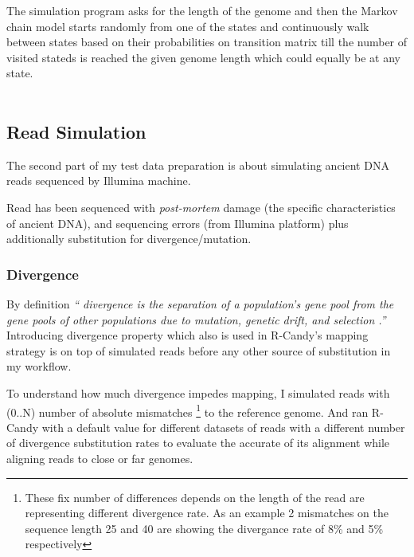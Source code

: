 \documentclass[11pt,a4paper]{report}
\newcommand{\quotes}[1]{``#1''}
\begin{document}
The simulation program asks for the length of the genome and then the Markov chain 
model starts randomly from one of the states and continuously walk between states 
based on their probabilities on transition matrix till the number of visited stateds 
is reached the given genome length which could equally be at any state. \\\\



\subsection{Read Simulation} \label{Read Simulation}

The second part of my test data preparation is about simulating ancient DNA reads 
sequenced by Illumina machine.

Read has been sequenced with \emph{post-mortem }damage \cite{damagepattern} (the 
specific characteristics of ancient DNA), and sequencing errors \cite{phred1} (from
Illumina platform) plus additionally substitution for divergence/mutation.




\subsubsection{Divergence} \label{Divergence}

By definition \emph{\quotes{ divergence is the separation
of a population's gene pool from the gene pools of other populations 
due to mutation, genetic drift, and selection \cite{divergence1}.}}\\

Introducing divergence property which also is used in R-Candy's mapping strategy 
is on top of simulated reads before any other source of substitution in my workflow. 

To understand how much divergence impedes mapping, I simulated reads with (0..N) 
number of absolute mismatches \footnote {These fix number of differences depends 
on the length of the read are representing different divergence rate. As an example 
2 mismatches on the sequence length 25 and 40 are showing the divergance rate of 8\% 
and 5\% respectively} to the reference genome.
And ran R-Candy with a default value for different datasets of reads with a 
different number of divergence substitution rates to evaluate the accurate of its 
alignment while aligning reads to close or far genomes.
 
\end{document}
